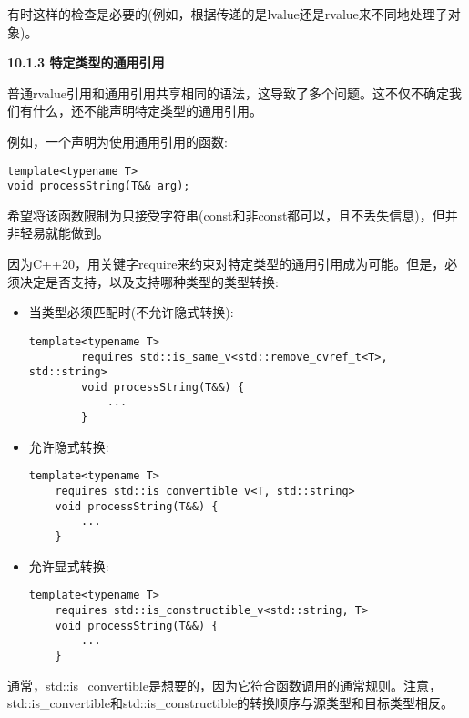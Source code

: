有时这样的检查是必要的(例如，根据传递的是lvalue还是rvalue来不同地处理子对象)。\par

\hspace*{\fill} \par %
\textbf{10.1.3 特定类型的通用引用}

普通rvalue引用和通用引用共享相同的语法，这导致了多个问题。这不仅不确定我们有什么，还不能声明特定类型的通用引用。\par

例如，一个声明为使用通用引用的函数:\par

\begin{lstlisting}[caption={}]
template<typename T>
void processString(T&& arg);
\end{lstlisting}


希望将该函数限制为只接受字符串(const和非const都可以，且不丢失信息)，但并非轻易就能做到。\par

因为C++20，用关键字require来约束对特定类型的通用引用成为可能。但是，必须决定是否支持，以及支持哪种类型的类型转换:\par

\begin{itemize}
	\item 当类型必须匹配时(不允许隐式转换):\par
	\begin{lstlisting}[caption={}]
		template<typename T>
		requires std::is_same_v<std::remove_cvref_t<T>, std::string>
		void processString(T&&) {
			...
		}
	\end{lstlisting}
	\item 允许隐式转换:\par
	\begin{lstlisting}[caption={}]
	template<typename T>
	requires std::is_convertible_v<T, std::string>
	void processString(T&&) {
		...
	}
	\end{lstlisting}
	\item 允许显式转换:
	\begin{lstlisting}[caption={}]
	template<typename T>
	requires std::is_constructible_v<std::string, T>
	void processString(T&&) {
		...
	}
	\end{lstlisting}
\end{itemize}

通常，std::is\_convertible是想要的，因为它符合函数调用的通常规则。注意，std::is\_convertible和std::is\_constructible的转换顺序与源类型和目标类型相反。\par

